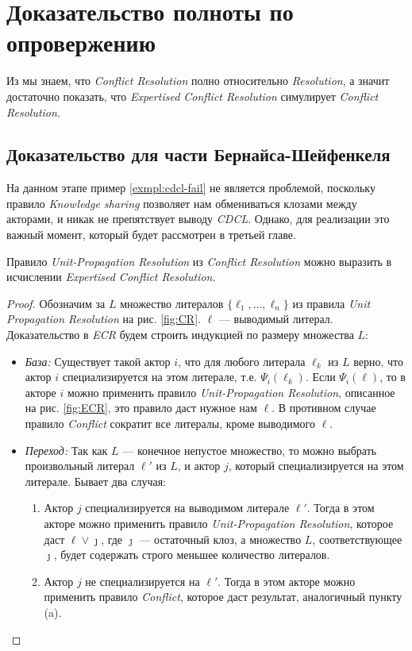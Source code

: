 \section{Доказательство полноты по опровержению}

Из \cite{DBLP:journals/corr/SlaneyP16} мы знаем, что \emph{Conflict Resolution} полно относительно \emph{Resolution}, а значит достаточно показать, что \emph{Expertised Conflict Resolution} симулирует \emph{Conflict Resolution}.

\subsection{Доказательство для части Бернайса-Шейфенкеля}

На данном этапе пример \ref{exmpl:cdcl-fail} не является проблемой, поскольку правило \emph{Knowledge sharing} позволяет нам обмениваться клозами между акторами, и никак не препятствует выводу \emph{CDCL}. Однако, для реализации это важный момент, который будет рассмотрен в третьей главе.

\begin{lemma}
\label{lem:upr}
Правило \emph{Unit-Propagation Resolution} из \emph{Conflict Resolution} можно выразить в исчислении \emph{Expertised Conflict Resolution}.
\end{lemma}
\begin{proof}
Обозначим за $L$ множество литералов $\{\ell_1, \ldots, \ell_n\}$ из правила \emph{Unit Propagation Resolution} на рис. \ref{fig:CR}. $\ell$ --- выводимый литерал.
Доказательство в \emph{ECR} будем строить индукцией по размеру множества $L$:
\begin{itemize}[label=$\star$]
	\item \emph{База:} Существует такой актор $i$, что для любого литерала $\ell_k$ из $L$ верно, что актор $i$ специализируется на этом литерале, т.е. $\Psi_i(\ell_k)$. Если $\Psi_i(\ell)$, то в акторе $i$ можно применить правило \emph{Unit-Propagation Resolution}, описанное на рис. \ref{fig:ECR}, это правило даст нужное нам $\ell$. В противном случае правило \emph{Conflict} сократит все литералы, кроме выводимого $\ell$.
    \item \emph{Переход:} Так как $L$ --- конечное непустое множество, то можно выбрать произвольный литерал $\ell'$ из $L$, и актор $j$, который специализируется на этом литерале. Бывает два случая:
    \begin{enumerate}
    	\item Актор $j$ специализируется на выводимом литерале $\ell'$. Тогда в этом акторе можно применить правило \emph{Unit-Propagation Resolution}, которое даст $\ell \vee \jmath$, где $\jmath$ --- остаточный клоз, а множество $L$, соответствующее $\jmath$, будет содержать строго меньшее количество литералов.
        \item Актор $j$ не специализируется на $\ell'$. Тогда в этом акторе можно применить правило \emph{Conflict}, которое даст результат, аналогичный пункту (a).
    \end{enumerate} 
\end{itemize}
\end{proof}

